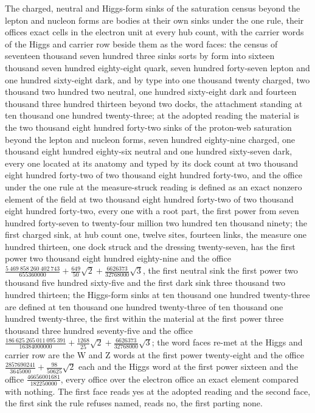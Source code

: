 \begin{chtheorem}\label{box:IV-3-D540063-cbsk-t1:1}
The charged, neutral and Higgs-form sinks of the saturation census beyond the lepton and nucleon forms are bodies at their own sinks under the one rule, their offices exact cells in the electron unit at every hub count, with the carrier words of the Higgs and carrier row beside them as the word faces: the census of seventeen thousand seven hundred three sinks sorts by form into sixteen thousand seven hundred eighty-eight quark, seven hundred forty-seven lepton and one hundred sixty-eight dark, and by type into one thousand twenty charged, two thousand two hundred two neutral, one hundred sixty-eight dark and fourteen thousand three hundred thirteen beyond two docks, the attachment standing at ten thousand one hundred twenty-three; at the adopted reading the material is the two thousand eight hundred forty-two sinks of the proton-web saturation beyond the lepton and nucleon forms, seven hundred eighty-nine charged, one thousand eight hundred eighty-six neutral and one hundred sixty-seven dark, every one located at its anatomy and typed by its dock count at two thousand eight hundred forty-two of two thousand eight hundred forty-two, and the office under the one rule at the measure-struck reading is defined as an exact nonzero element of the field at two thousand eight hundred forty-two of two thousand eight hundred forty-two, every one with a root part, the first power from seven hundred forty-seven to twenty-four million two hundred ten thousand ninety; the first charged sink, at hub count one, twelve sites, fourteen links, the measure one hundred thirteen, one dock struck and the dressing twenty-seven, has the first power two thousand eight hundred eighty-nine and the office $\tfrac{5\ 469\ 858\ 260\ 402\ 743}{655360000} + \tfrac{649}{50}\sqrt{2} + \tfrac{6626373}{32768000}\sqrt{3}$, the first neutral sink the first power two thousand five hundred sixty-five and the first dark sink three thousand two hundred thirteen; the Higgs-form sinks at ten thousand one hundred twenty-three are defined at ten thousand one hundred twenty-three of ten thousand one hundred twenty-three, the first within the material at the first power three thousand three hundred seventy-five and the office $\tfrac{186\ 625\ 265\ 011\ 095\ 391}{16384000000} + \tfrac{1268}{25}\sqrt{2} + \tfrac{6626373}{32768000}\sqrt{3}$; the word faces re-met at the Higgs and carrier row are the W and Z words at the first power twenty-eight and the office $\tfrac{2857690241}{3645000} + \tfrac{98}{50625}\sqrt{2}$ each and the Higgs word at the first power sixteen and the office $\tfrac{46656001681}{182250000}$, every office over the electron office an exact element compared with nothing. The first face reads yes at the adopted reading and the second face, the first sink the rule refuses named, reads no, the first parting none.
\end{chtheorem}
